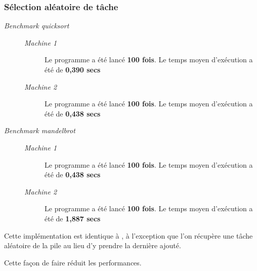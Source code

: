 \documentclass{article}
\newcommand{\docref}[1]{\textit{\nameref{#1}}} %
\def\mone{\textit{Machine 1}} %
\def\mtwo{\textit{Machine 2}} %
\def\bone{\textit{Benchmark quicksort}}
\def\btwo{\textit{Benchmark mandelbrot}}
\begin{document}
\subsubsection{Sélection aléatoire de tâche}
\begin{description}
  \item[\bone] \hspace{1em}
        \begin{description}
          \item[\mone] Le programme a été lancé \textbf{100 fois}.
                Le temps moyen d'exécution a été de \textbf{0,390 secs}
          \item[\mtwo] Le programme a été lancé \textbf{100 fois}.
                Le temps moyen d'exécution a été de \textbf{0,438 secs}
        \end{description}

  \item[\btwo] \hspace{1em}
        \begin{description}
          \item[\mone] Le programme a été lancé \textbf{100 fois}.
                Le temps moyen d'exécution a été de \textbf{0,438 secs}
          \item[\mtwo] Le programme a été lancé \textbf{100 fois}.
                Le temps moyen d'exécution a été de \textbf{1,887 secs}
        \end{description}
\end{description}

Cette implémentation est identique à \docref{stats:stack}, à l'exception que
l'on récupère une tâche aléatoire de la pile au lieu d'y prendre la dernière
ajouté.

Cette façon de faire réduit les performances.
\end{document}
